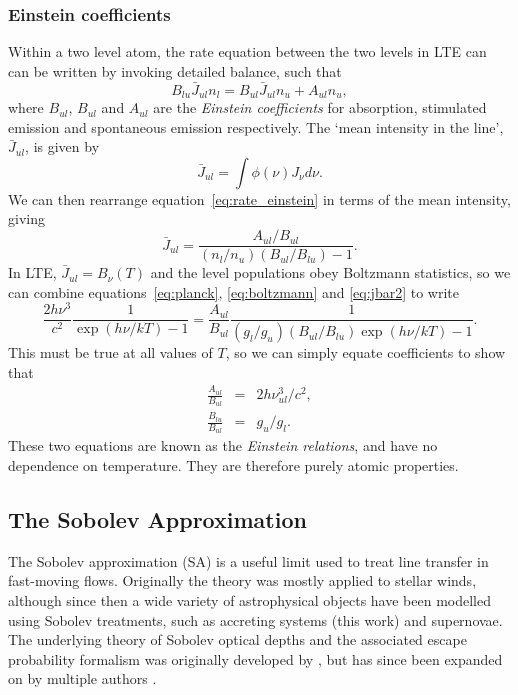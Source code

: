 \subsubsection{Einstein coefficients}

Within a two level atom, the rate equation between the two levels in LTE can
can be written by invoking detailed balance, such that 
\begin{equation}
B_{lu} \bar{J}_{ul} n_l = B_{ul} \bar{J}_{ul} n_u + A_{ul} n_u,
\label{eq:rate_einstein}
\end{equation}
where $B_{ul}$, $B_{ul}$ and $A_{ul}$ are the {\em Einstein coefficients}
for absorption, stimulated emission and spontaneous emission respectively.
The `mean intensity in the line', $\bar{J}_{ul}$, is given by
\begin{equation}
\bar{J}_{ul} = \int \phi(\nu) J_\nu d\nu.
\label{eq:jbar}
\end{equation}
We can then rearrange equation~\ref{eq:rate_einstein} in terms of 
the mean intensity, giving
\begin{equation}
\bar{J}_{ul} = \frac{A_{ul} / B_{ul}}{(n_l/n_u)(B_{ul}/B_{lu}) - 1}.
\label{eq:jbar2}
\end{equation}
In LTE, $\bar{J}_{ul} = B_\nu (T)$ and the level populations obey Boltzmann statistics, so we can combine equations~\ref{eq:planck}, \ref{eq:boltzmann}
and \ref{eq:jbar2} to write
\begin{equation}
\frac{2 h \nu^3}{c^2} \frac{1}{\exp(h\nu / kT) - 1} =
\frac{A_{ul}}{B_{ul}} \frac{1}{(g_l/g_u)(B_{ul}/B_{lu}) \exp(h\nu / kT) - 1}.
\end{equation}
This must be true at all values of $T$, so we can simply equate coefficients
to show that
\begin{eqnarray}
\frac{A_{ul}}{B_{ul}} &=& 2 h \nu_{ul}^3/c^2, \\  
\frac{B_{lu}}{B_{ul}} &=& g_u/g_l.  
 \label{eq:einstein_relations}     
\end{eqnarray}
These two equations are known as the {\em Einstein relations}, and have 
no dependence on temperature. They are therefore purely atomic properties.

\subsection{The Sobolev Approximation}
\label{sec:sobolev}
The Sobolev approximation (SA) is a useful limit 
used to treat line transfer in fast-moving flows. Originally 
the theory was mostly applied to stellar winds, although since then
a wide variety of astrophysical objects have been modelled using Sobolev treatments,
such as accreting systems (this work) and supernovae. The underlying theory
of Sobolev optical depths and the associated escape probability formalism
was originally developed by \cite{sobolev1957,sobolev1960}, but has since
been expanded on by multiple authors 
\citep[e.g.][]{rybicki1970,rybickihummer1978,hubeny2001rt}.

